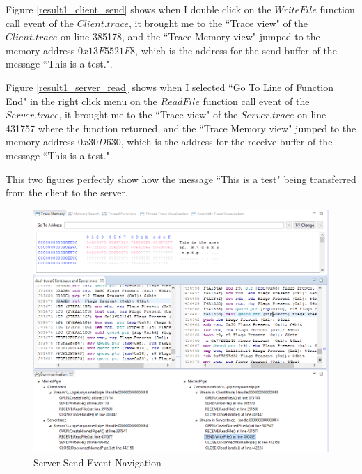 Figure \ref{result1_client_send} shows when I double click on the $WriteFile$ function call event of the $Client.trace$, it brought me to the ``Trace view" of the $Client.trace$ on line 385178, and the ``Trace Memory view" jumped to the memory address $0x13F5521F8$, which is the address for the send buffer of the message ``This is a test.".

Figure \ref{result1_server_read} shows when I selected ``Go To Line of Function End" in the right click menu on the $ReadFile$ function call event of the $Server.trace$, it brought me to the ``Trace view" of the $Server.trace$ on line 431757 where the function returned, and the ``Trace Memory view" jumped to the memory address $0x30D630$, which is the address for the receive buffer of the message ``This is a test.".

This two figures perfectly show how the message ``This is a test" being transferred from the client to the server.

\begin{figure}[H]
\centerline{\includegraphics[scale=0.4]{Figures/result1_server_send}}
 \caption{Server Send Event Navigation}
\label{result1_server_send}
\end{figure}


